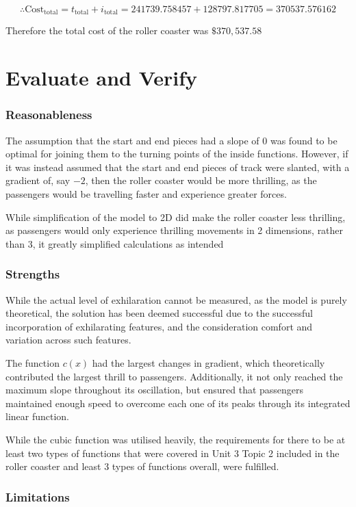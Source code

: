 \documentclass[10pt, letterpaper]{article}
\begin{document}
 $$\therefore \textrm{Cost}_{\mathrm{total}}=t_\mathrm{total}+i_\mathrm{total}=241739.758457+128797.817705=370537.576162$$

Therefore the total cost of the roller coaster was $\$370,537.58$
\section{Evaluate and Verify}
\subsubsection{Reasonableness}



The assumption that the start and end pieces had a slope of 0 was found to be optimal for joining them to the turning points of the inside functions. However, if it was instead assumed that the start and end pieces of track were slanted, with a gradient of, say $-2$, then the roller coaster would be more thrilling, as the passengers would be travelling faster and experience greater forces.


While simplification of the model to 2D did make the roller coaster less thrilling, as passengers would only experience thrilling movements in 2 dimensions, rather than 3, it greatly simplified calculations as intended


\subsubsection{Strengths}
While the actual level of exhilaration cannot be measured, as the model is purely theoretical, the solution has been deemed successful due to the successful incorporation of exhilarating features, and the consideration comfort and variation across such features.

The function $c(x)$ had the largest changes in gradient, which theoretically contributed the largest thrill to passengers. Additionally, it not only reached the maximum slope throughout its oscillation, but ensured that passengers maintained enough speed to overcome each one of its peaks through its integrated linear function.

While the cubic function was utilised heavily, the requirements for there to be at least two types of functions that were covered in Unit 3 Topic 2 included in the roller coaster and least 3 types of functions overall, were fulfilled.



\subsubsection{Limitations}
\end{document}
